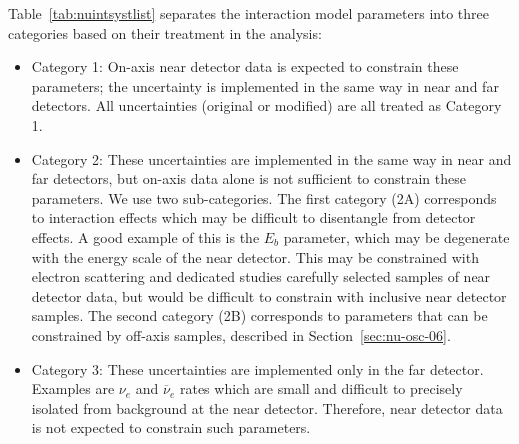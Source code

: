 Table~\ref{tab:nuintsystlist} separates the interaction model parameters into three categories based on their treatment in the analysis:
\begin{itemize}
\item Category 1:  On-axis near detector data is expected to constrain these parameters; the uncertainty is implemented in the same way in near and far detectors.  All  uncertainties (original or modified) are all treated as Category 1.
\item Category 2: These uncertainties are implemented in the same way in near and far detectors, but on-axis data alone is not sufficient to constrain these parameters. We use two sub-categories. The first category (2A) corresponds to interaction effects which may be difficult to disentangle from detector effects. A good example of this is the $E_b$ parameter, which may be degenerate with the energy scale of the near detector.  This may be constrained with electron scattering and dedicated studies carefully selected samples of near detector data, but would be difficult to constrain with inclusive near detector samples. The second category (2B) corresponds to parameters that can be constrained by off-axis samples, described in Section~\ref{sec:nu-osc-06}.
\item Category 3: These uncertainties are implemented only in the far detector.  Examples are $\nu_e$ and $\overline{\nu}_e$ rates which are small and difficult to precisely isolated from background at the near detector.  Therefore, near detector data is not expected to constrain such parameters.
\end{itemize}


